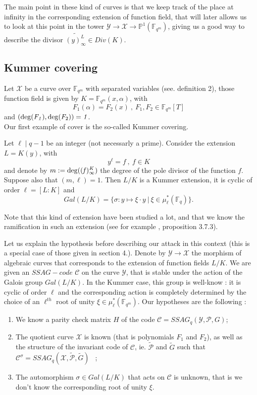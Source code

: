 \documentclass[10pt]{article}
\newcommand{\s}{\vspace{0.3cm}}
\newcommand{\cd}{\cdot}
\newcommand{\fqm}{\mathbb{F}_{q^m}}
\newcommand{\fq}{\mathbb{F}_q}
\newcommand{\X}{\mathcal{X}}
\newcommand{\Y}{\mathcal{Y}}
\newcommand{\PR}{\mathcal{P}}
\begin{document}
\s

The main point in these kind of curves is that we keep track of the place at infinity in the corresponding extension of function field, that will later allows us to look at this point in the tower $\Y \rightarrow \X \rightarrow \mathbb{P}^1(\fqm)$, giving us a good way to describe the divisor $\widetilde{(y)_{\infty}^L} \in Div(K)$.


\s

\subsection{Kummer covering}

\s

Let $\X$ be a curve over $\fqm$ with separated variables (see. definition 2), those function field is given by $K=\fqm(x,\alpha)$, with
\[F_1(\alpha) = F_2(x) \ , \ F_1,F_2 \in \fqm[T] \]
and $(\rm{deg}\it(F_1),\rm{deg}\it(F_{\rm{2}}))=1$.  \\
Our first example of cover is the so-called Kummer covering.

\s

Let $\ell \mid q-1$ be an integer (not necessarly a prime). Consider the extension $L=K(y)$, with
\[y^{\ell} = f \ , \ f \in K\]
and denote by $m:=\rm{deg}\it((f)_{\infty}^K)$ the degree of the pole divisor of the function $f$. Suppose also that $(m,\ell)=1$. Then $L/K$ is a Kummer extension, it is cyclic of order $\ell=[L:K]$ and 
\[Gal(L/K) = \{ \sigma : y \mapsto \xi \cd y \ | \ \xi \in \mu^*_{\ell}(\fq)\}.\] 

\s

Note that this kind of extension have been studied a lot, and that we know the ramification in such an extension (see for example \cite{Sti}, proposition 3.7.3).

Let us explain the hypothesis before describing our attack in this context (this is a special case of those given in section 4.). Denote by $\Y \rightarrow \X$ the morphism of algebraic curves that corresponds to the extension of function fields $L/K$. We are given an $SSAG-code$ $\mathcal{C}$ on the curve $\Y$, that is stable under the action of the Galois group $Gal(L/K)$. In the Kummer case, this group is well-know :  it is cyclic of order $\ell$ and the corresponding action is completely determined by the choice of an $\ell^{th}$ root of unity $\xi \in \mu^*_{\ell}(\fqm)$. Our hypotheses are the following :

\s

\begin{enumerate}
\item We know a parity check matrix $H$ of the code $\mathcal{C} = SSAG_q(\Y,\PR,G)$;
\item The quotient curve $\X$ is known (that is polynomials $F_1$ and $F_2$), as well as the structure of the invariant code of $\mathcal{C}$, ie. $\tilde{\PR}$ and $\tilde{G}$ such that $\mathcal{C}^{\sigma} = SSAG_q(\X,\tilde{\PR},\tilde{G})$ \ ;
\item The automorphism $\sigma \in Gal(L/K)$ that acts on $\mathcal{C}$ is unknown, that is we don't know the corresponding root of unity $\xi$.
\end{enumerate}
\end{document}
